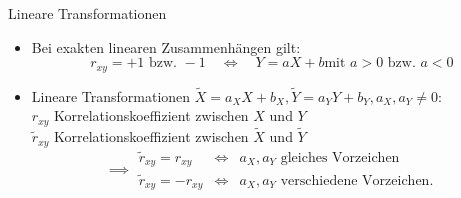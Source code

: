 \documentclass[
  10pt,
  ignorenonframetext,
]{beamer}
\providecommand{\tightlist}{%
  \setlength{\itemsep}{0pt}\setlength{\parskip}{0pt}}
\begin{document}
\begin{frame}{Lineare Transformationen}
\protect\hypertarget{lineare-transformationen}{}
\begin{itemize}
\tightlist
\item
  Bei exakten linearen Zusammenhängen gilt: \[
             r_{xy} = +1 \mbox{ bzw. }-1 \quad \iff \quad Y = aX+b
  \mbox{
             mit }a > 0 \mbox{ bzw. }a < 0
         \]
\item
  Lineare Transformationen
  \(\tilde{X} = a_X X+b_X, \tilde{Y} = a_Y Y+b_Y, a_X, a_Y \neq 0\):\\
  \(r_{xy}\) Korrelationskoeffizient zwischen \(X\) und \(Y\)\\
  \(\tilde{r}_{xy}\) Korrelationskoeffizient zwischen \(\tilde{X}\) und
  \(\tilde{Y}\) \[
         \implies \begin{array}{lcl}
   \tilde{r}_{xy} = r_{xy} & \iff & a_X, a_Y \text{ gleiches Vorzeichen}\\
   \tilde{r}_{xy} = -r_{xy} & \iff & a_X, a_Y \text{ verschiedene Vorzeichen}.
   \end{array}
         \]
\end{itemize}
\end{frame}
\end{document}
